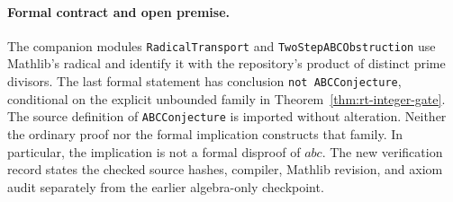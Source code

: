 \paragraph{Formal contract and open premise.}
The companion modules \texttt{RadicalTransport} and
\texttt{TwoStepABCObstruction} use Mathlib's radical and identify it with
the repository's product of distinct prime divisors. The last formal
statement has conclusion \texttt{not ABCConjecture}, conditional on the
explicit unbounded family in Theorem~\ref{thm:rt-integer-gate}. The source
definition of \texttt{ABCConjecture} is imported without alteration.
Neither the ordinary proof nor the formal implication constructs that
family. In particular, the implication is not a formal disproof of $abc$.
The new verification record states the checked source hashes, compiler,
Mathlib revision, and axiom audit separately from the earlier algebra-only
checkpoint.
